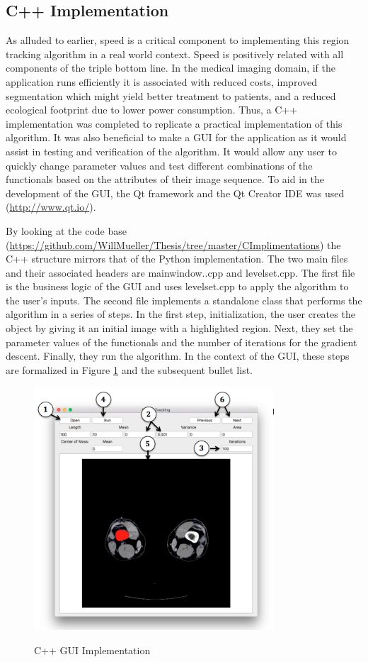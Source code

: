 \documentclass{article}
\begin{document}
    \subsection{C++ Implementation}
    As alluded to earlier, speed is a critical component to implementing this region tracking algorithm in a real world context. Speed is positively related with all components of the triple bottom line. In the medical imaging domain, if the application runs efficiently it is associated with reduced costs, improved segmentation which might yield better treatment to patients, and a reduced ecological footprint due to lower power consumption. Thus, a C++ implementation was completed to replicate a practical implementation of this algorithm. It was also beneficial to make a GUI for the application as it would assist in testing and verification of the algorithm. It would allow any user to quickly change parameter values and test different combinations of the functionals based on the attributes of their image sequence. To aid in the development of the GUI, the Qt framework and the Qt Creator IDE was used (\url{http://www.qt.io/}).
    
    By looking at the code base (\url{https://github.com/WillMueller/Thesis/tree/master/CImplimentations}) the C++ structure mirrors that of the Python implementation. The two main files and their associated headers are mainwindow..cpp and levelset.cpp. The first file is the business logic of the GUI and uses levelset.cpp to apply the algorithm to the user's inputs. The second file implements a standalone class that performs the algorithm in a series of steps. In the first step, initialization, the user creates the object by giving it an initial image with a highlighted region. Next, they set the parameter values of the functionals and the number of iterations for the gradient descent. Finally, they run the algorithm. In the context of the GUI, these steps are formalized in Figure \ref{cpp_implementation} and the subsequent bullet list.
    
    \begin{figure}[!ht]
      \caption{C++ GUI Implementation}
      \centering
      \includegraphics[width=0.8\textwidth]{c++}
      \label{cpp_implementation}
    \end{figure}
    
\end{document}

